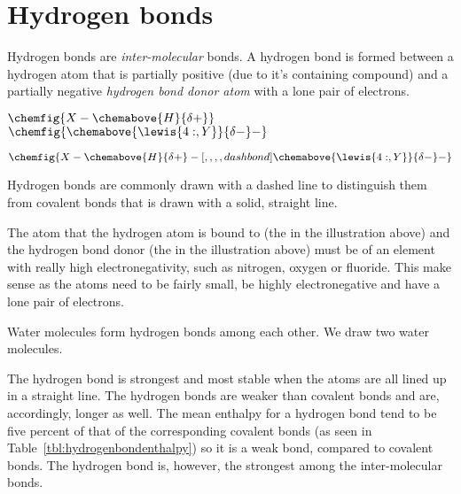 \documentclass[../mit-general-chemistry.tex]{subfiles}
\begin{document}
\section{Hydrogen bonds}



Hydrogen bonds are {\em inter-molecular} bonds. A hydrogen bond is
formed between a hydrogen atom that is partially positive (due to it's
containing compound) and a partially negative {\em hydrogen bond donor
  atom} with a lone pair of electrons.

\vspace{2em}
\hspace*{\fill}
$\chemfig{
    X-\chemabove{H}{\scriptsize\delta +}
}$
\hfill
$\chemfig{
    \chemabove{\lewis{4:,Y}}{\scriptsize\delta -}-
}$
\hspace*{\fill}

\vspace{.5em}
\hspace*{\fill}
$\chemfig{
    X-\chemabove{H}{\scriptsize\delta +}-[,,,,dash bond]\chemabove{\lewis{4:,Y}}{\scriptsize\delta -}-
}$
\hspace*{\fill}

Hydrogen bonds are commonly drawn with a dashed line to distinguish
them from covalent bonds that is drawn with a solid, straight line.

The atom that the hydrogen atom is bound to (the  in the
illustration above) and the hydrogen bond donor (the  in the
illustration above) must be of an element with really high
electronegativity, such as nitrogen, oxygen or fluoride. This make
sense as the atoms need to be fairly small, be highly electronegative
and have a lone pair of electrons.

Water molecules form hydrogen bonds among each other. We draw two
water molecules.

\begin{center}
\end{center}

The hydrogen bond is strongest and most stable when the atoms are all
lined up in a straight line. The hydrogen bonds are weaker than
covalent bonds and are, accordingly, longer as well. The mean enthalpy
for a hydrogen bond tend to be five percent of that of the
corresponding covalent bonds (as seen in
Table~\ref{tbl:hydrogenbondenthalpy}) so it is a weak bond, compared
to covalent bonds. The hydrogen bond is, however, the strongest
among the inter-molecular bonds.
\end{document}
